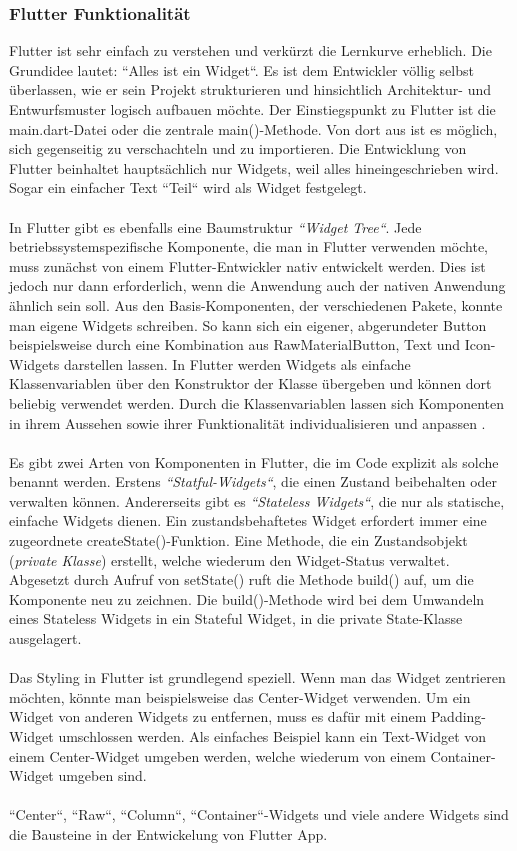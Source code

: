 \subsubsection{Flutter Funktionalität}
Flutter ist sehr einfach zu verstehen und verkürzt die Lernkurve erheblich. Die Grundidee lautet: “Alles ist ein Widget“. Es ist dem Entwickler völlig selbst überlassen, wie er sein Projekt
strukturieren und hinsichtlich Architektur- und Entwurfsmuster logisch aufbauen möchte. Der Einstiegspunkt zu Flutter ist die main.dart-Datei oder die zentrale main()-Methode. Von dort aus ist es möglich, sich gegenseitig zu verschachteln und zu importieren.
Die Entwicklung von Flutter beinhaltet hauptsächlich nur Widgets, weil alles hineingeschrieben wird.
Sogar ein einfacher Text “Teil“ wird als Widget festgelegt.
\\\\
In Flutter gibt es ebenfalls eine Baumstruktur \textit{“Widget Tree“}. Jede betriebssystemspezifische Komponente, die man in Flutter verwenden möchte, muss zunächst von einem Flutter-Entwickler nativ entwickelt werden. Dies ist jedoch nur dann erforderlich, wenn die Anwendung auch der nativen Anwendung ähnlich sein soll.
Aus den Basis-Komponenten, der verschiedenen Pakete, konnte man eigene Widgets schreiben. So kann sich ein eigener, abgerundeter Button beispielsweise durch eine Kombination aus RawMaterialButton, Text und Icon-Widgets darstellen lassen.
In Flutter werden Widgets  als einfache Klassenvariablen über den Konstruktor der Klasse übergeben und können dort beliebig verwendet werden.
Durch die Klassenvariablen lassen sich Komponenten in
ihrem Aussehen sowie ihrer Funktionalität individualisieren und anpassen \cite{SDK}.\\\\
Es gibt zwei Arten von Komponenten in Flutter, die im Code explizit als solche benannt werden. Erstens  \textit{“Statful-Widgets“}, die einen Zustand beibehalten oder verwalten können. Andererseits gibt es \textit{“Stateless Widgets“}, die nur als statische, einfache Widgets dienen. Ein zustandsbehaftetes Widget erfordert immer eine zugeordnete createState()-Funktion. Eine Methode, die ein Zustandsobjekt (\textit{private Klasse}) erstellt, welche wiederum
den Widget-Status verwaltet. Abgesetzt durch Aufruf von setState()
ruft die Methode build() auf, um die Komponente neu zu zeichnen. Die build()-Methode wird bei dem Umwandeln eines Stateless Widgets in ein Stateful Widget, in die private State-Klasse ausgelagert.\\\\
Das Styling in Flutter ist grundlegend speziell. Wenn man das Widget zentrieren möchten, könnte man beispielsweise das Center-Widget verwenden.
Um ein Widget von anderen Widgets zu entfernen, muss es dafür mit einem Padding-Widget umschlossen werden. Als einfaches Beispiel kann ein Text-Widget von einem Center-Widget umgeben werden, welche wiederum von einem Container-Widget umgeben sind.\\\\
“Center“, “Raw“, “Column“, “Container“-Widgets und viele andere Widgets
sind die Bausteine in der Entwickelung von Flutter App.
